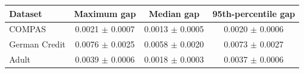 \begin{tabular}{lccc}
\hline
Dataset & Maximum gap & Median gap & 95th-percentile gap \\
\hline
COMPAS & 0.0021 $\pm$ 0.0007 & 0.0013 $\pm$ 0.0005 & 0.0020 $\pm$ 0.0006 \\
German Credit & 0.0076 $\pm$ 0.0025 & 0.0058 $\pm$ 0.0020 & 0.0073 $\pm$ 0.0027 \\
Adult & 0.0039 $\pm$ 0.0006 & 0.0018 $\pm$ 0.0003 & 0.0037 $\pm$ 0.0006 \\
\hline
\end{tabular}